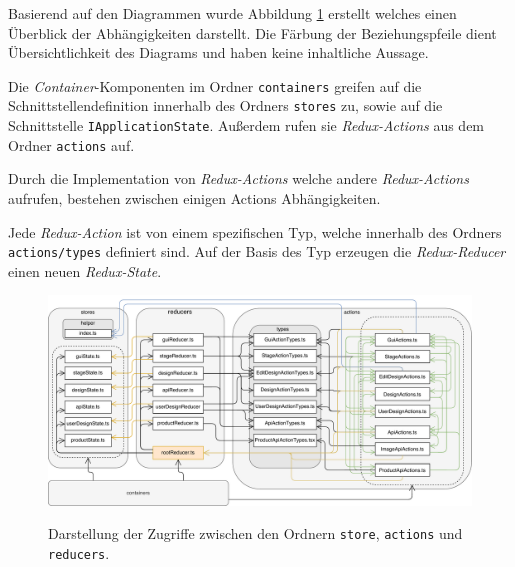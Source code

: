 Basierend auf den Diagrammen wurde Abbildung \ref{fig:Redux} erstellt welches einen Überblick der Abhängigkeiten darstellt. Die Färbung der Beziehungspfeile dient Übersichtlichkeit des Diagrams und haben keine inhaltliche Aussage.

Die \emph{Container}-Komponenten im Ordner \lstinline|containers| greifen auf die Schnittstellendefinition innerhalb des Ordners \lstinline|stores| zu, sowie auf die Schnittstelle \lstinline|IApplicationState|. 
Außerdem rufen sie \emph{Redux-Actions} aus dem Ordner \lstinline|actions| auf.

Durch die Implementation von \emph{Redux-Actions} welche andere \emph{Redux-Actions} aufrufen, bestehen zwischen einigen  Actions Abhängigkeiten.  

Jede \emph{Redux-Action} ist von einem spezifischen Typ, welche innerhalb des Ordners \lstinline|actions/types| definiert sind. Auf der Basis des Typ erzeugen die \emph{Redux-Reducer} einen neuen \emph{Redux-State}.

\begin{figure}[H]
    \centering
    \caption{Darstellung der Zugriffe zwischen den Ordnern \lstinline|store|, \lstinline|actions| und \lstinline|reducers|.}
    \includegraphics[width=1\textwidth]{diagrams/Ist-Architektur/Redux.pdf}
    \label{fig:Redux}
\end{figure}



